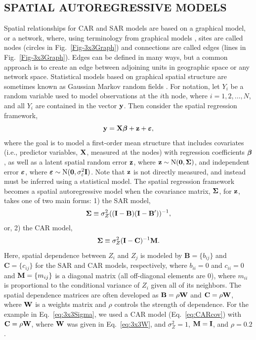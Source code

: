 \documentclass[11pt, titlepage]{article}\usepackage[]{graphicx}\usepackage[]{color}
\begin{document}
\begin{spacing}{1.9}
\begin{flushleft}
\section*{SPATIAL AUTOREGRESSIVE MODELS}

Spatial relationships for CAR and SAR models are based on a graphical model, or a network, where, using terminology from graphical models \citep[e.g.,][]{Laur:grap:1996, Whit:grap:2009}, sites are called nodes (circles in Fig.~\ref{Fig-3x3Graph}) and connections are called edges (lines in Fig.~\ref{Fig-3x3Graph}). Edges can be defined in many ways, but a common approach is to create an edge between adjoining units in geographic space or any network space. Statistical models based on graphical spatial structure are sometimes known as Gaussian Markov random fields \citep[e.g.,][]{Rue:Held:Gaus:2005}.  For notation, let $Y_i$ be a random variable used to model observations at the $i$th node, where $i = 1, 2, \dots, N$, and all $Y_i$ are contained in the vector $\mathbf{y}$. Then consider the spatial regression framework, 
\begin{equation}
  \mathbf{y} = \mathbf{X}{\boldsymbol{\beta}} + \mathbf{z}  + \mbox{\boldmath $\varepsilon$},
  \label{eq:ArealFramework}
\end{equation}
where the goal is to model a first-order mean structure that includes covariates (i.e., predictor variables, $\mathbf{X}$, measured at the nodes) with regression coefficients ${\boldsymbol{\beta}}$, as well as a latent spatial random error $\mathbf{z}$, where $\mathbf{z} \sim \textrm{N}(\mathbf{0},\mbox{\boldmath $\Sigma$})$, and independent error $\mbox{\boldmath $\varepsilon$}$, where $\mbox{\boldmath $\varepsilon$} \sim \textrm{N}(\mathbf{0},\sigma^2_\varepsilon \mathbf{I})$. Note that $\mathbf{z}$ is not directly measured, and instead must be inferred using a statistical model. The spatial regression framework becomes a spatial autoregressive model when the covariance matrix, $\mbox{\boldmath $\Sigma$}$, for $\mathbf{z}$, takes one of two main forms: 1) the SAR model,
\begin{equation} \label{eq:SARcov}
  \mbox{\boldmath $\Sigma$} \equiv \sigma^2_Z ((\mathbf{I}-\mathbf{B})(\mathbf{I}-\mathbf{B}^{\prime}))^{-1},
\end{equation}
or, 2) the CAR model,
\begin{equation} \label{eq:CARcov}
  \mbox{\boldmath $\Sigma$} \equiv \sigma^2_Z (\mathbf{I}-\mathbf{C})^{-1}\mathbf{M}.
\end{equation}
Here, spatial dependence between $Z_i$ and $Z_j$ is modeled by $\mathbf{B} = \{b_{ij}\}$ and $\mathbf{C} = \{c_{ij}\}$ for the SAR and CAR models, respectively, where $b_{ii} = 0$ and $c_{ii} = 0$ and $\mathbf{M} = \{m_{ij}\}$ is a diagonal matrix (all off-diagonal elements are 0), where $m_{ii}$ is proportional to the conditional variance of $Z_i$ given all of its neighbors. The spatial dependence matrices are often developed as $\mathbf{B} = \rho\mathbf{W}$ and $\mathbf{C} = \rho\mathbf{W}$, where $\mathbf{W}$ is a weights matrix and $\rho$ controls the strength of dependence.  For the example in Eq.~\ref{eq:3x3Sigma}, we used a CAR model (Eq.~\ref{eq:CARcov}) with $\mathbf{C} = \rho\mathbf{W}$, where $\mathbf{W}$ was given in Eq.~\ref{eq:3x3W}, and $\sigma^2_Z =1$, $\mathbf{M} = \mathbf{I}$, and $\rho = 0.2$.


\end{flushleft}
\end{spacing}
\end{document}
